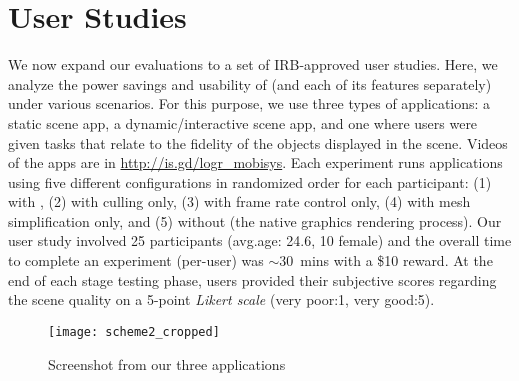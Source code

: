 \section{User Studies}
\label{sec:userstudies}




We now expand our evaluations to a set of IRB-approved user studies. 
%
Here, we analyze the power savings and usability of {\myit} (and each of its features separately) under various scenarios. 
%
For this purpose, we use three types of applications: a static scene app,
a dynamic/interactive scene app, and one where users were given tasks that relate 
to the fidelity of the objects displayed in the scene. Videos of the apps are in \url{http://is.gd/logr\_mobisys}. 
%
Each experiment runs applications using five different configurations in
randomized order for each participant: 
%
(1) with {\myit}, 
(2) with {\myit} culling only, 
(3) with {\myit} frame rate control only, 
(4) with {\myit} mesh simplification only, and 
(5) without {\myit} (the native graphics rendering process). 
%
%
Our user study involved 25 participants (avg.age: 24.6, 10 female) and the 
overall time to complete an experiment (per-user) was $\sim$30~mins with a \$10 
reward. At the end of each stage testing phase, users provided their subjective scores regarding the scene quality on a 5-point \emph{Likert scale} (very poor:1, very good:5).
%
%


\begin{figure}[t]
    \centering
    \vspace{-2ex}
    \texttt{[image: scheme2\_cropped]}
    \vspace{-6ex}
    \caption{Screenshot from our three applications}
    \label{fig:application}
\end{figure}


